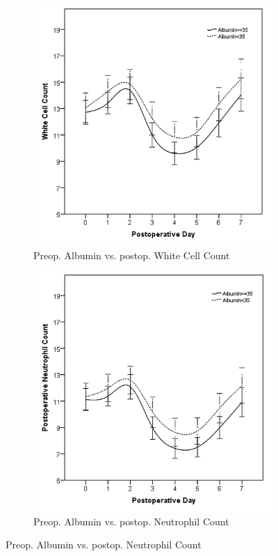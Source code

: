 \begin{figure}[p]
	\begin{subfigure}{0.48\textwidth}
		\centering
		\includegraphics[width=\textwidth]{Figures/sirs_alb_wcc}
		\caption{Preop. Albumin vs. postop. White Cell Count}
		\label{fig:sirs_alb_wcc}
	\end{subfigure}
	\hfill
	\begin{subfigure}{0.48\textwidth}
		\centering
		\includegraphics[width=\textwidth]{Figures/sirs_alb_neut}
		\caption{Preop. Albumin vs. postop. Neutrophil Count}
		\label{fig:sirs_alb_neut}
	\end{subfigure}	
\end{figure}

